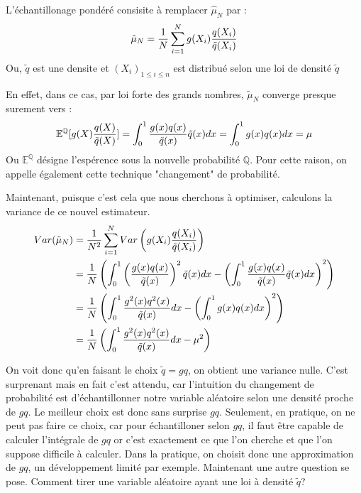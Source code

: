 \documentclass{article}
\begin{document}
L'échantillonage pondéré consisite à remplacer $\hat{\mu}_{N}$ par : 
\[\tilde{\mu}_{N}= \frac1{N} \sum_{i=1}^N g(X_i)\frac{q(X_i)}{\Tilde{q}(X_i)}\]
Ou, $\tilde{q}$ est une densite et $(X_{i})_{1\leq i \leq n }$ est distribué selon une loi de densité $\tilde{q}$ 


En effet, dans ce cas, par loi forte des grands nombres, $\tilde{\mu}_{N}$ converge presque surement vers : 
\[\mathbb{E}^{\mathbb{Q}}[g(X)\frac{q(X)}{\tilde{q}(X)}]=\int_0^1 \frac{g(x)q(x)}{\Tilde{q}(x)} \Tilde{q}(x) dx = \int_0^1 g(x)q(x)dx = \mu \]
 Ou $\mathbb{E}^{\mathbb{Q}}$ désigne l'espérence sous la nouvelle probabilité $\mathbb{Q}$. Pour cette raison, on 
 appelle également cette technique "changement" de probabilité.

Maintenant, puisque c'est cela que nous cherchons à optimiser, calculons la variance de ce nouvel estimateur.
\begin{align*} 
   Var(\tilde{\mu}_N) &= \frac1{N^2} \sum_{i=1}^N Var \left( g(X_i)\frac{q(X_i)}{\Tilde{q}(X_i)} \right)\\ 
   &= \frac1{N} \left ( \int_0^1 \left (\frac{g(x)q(x)}{\Tilde{q}(x)} \right )^2 \Tilde{q}(x) dx  - \left ( \int_0^1 \frac{g(x)q(x)}{\Tilde{q}(x)} \Tilde{q}(x) dx \right )^2 \right )\\
   &= \frac1{N} \left ( \int_0^1 \frac{g^2(x)q^2(x)}{\Tilde{q}(x)} dx  - \left ( \int_0^1 g(x)q(x) dx \right )^2 \right )\\
   &= \frac1{N} \left ( \int_0^1 \frac{g^2(x)q^2(x)}{\Tilde{q}(x)} dx  - \mu^{2} \right )\\
 \end{align*}

 On voit donc qu'en faisant le choix $\tilde{q}=gq$, on obtient une variance nulle. C'est surprenant mais en fait c'est attendu,
 car l'intuition du changement de probabilité est d'échantillonner notre variable aléatoire selon
 une densité proche de $gq$. Le meilleur choix est donc sans surprise $gq$. 
 Seulement, en pratique, on ne peut pas faire ce choix, car pour échantilloner selon $gq$,
il faut être capable de calculer l'intégrale de $gq$ or c'est exactement ce que l'on 
cherche et que l'on suppose difficile à calculer. Dans la pratique, on choisit donc une
approximation de $gq$, un développement limité par exemple. Maintenant une autre question se
pose. Comment tirer une variable aléatoire ayant une loi à densité $\tilde{q}$? 
\end{document}
